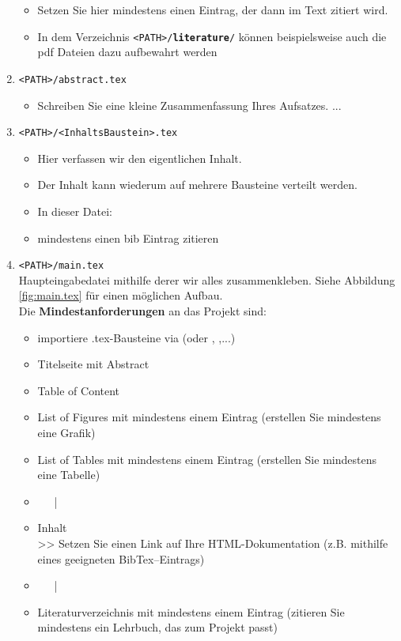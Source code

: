 \begin{enumerate}
\begin{itemize}
			\item Setzen Sie hier mindestens einen Eintrag, der dann im Text zitiert wird.
			\item In dem Verzeichnis \texttt{<PATH>/\textbf{literature}/} können beispielsweise auch die pdf Dateien dazu aufbewahrt werden
		\end{itemize}
		\item \texttt{<PATH>/abstract.tex}
		\begin{itemize}\small
			\item Schreiben Sie eine kleine Zusammenfassung Ihres Aufsatzes. ...
		\end{itemize}
		\item \texttt{<PATH>/<InhaltsBaustein>.tex}
		\begin{itemize}\small
			\item Hier verfassen wir den eigentlichen Inhalt.
			\item Der Inhalt kann wiederum auf mehrere Bausteine verteilt werden.
			\item In dieser Datei: \texttt{}
			\item mindestens einen bib Eintrag zitieren 
		\end{itemize}	
		\item \texttt{<PATH>/main.tex}\\\small
		Haupteingabedatei mithilfe derer wir alles zusammenkleben. Siehe Abbildung \ref{fig:main.tex} für einen möglichen Aufbau.\\
		Die \textbf{Mindestanforderungen} an das Projekt sind:\vspace{-0.1cm}
		\begin{itemize} 
			\item importiere .tex-Bausteine via  (oder , ,...)
			\item Titelseite mit Abstract
			\item Table of Content
			\item List of Figures mit mindestens einem Eintrag (erstellen Sie mindestens eine Grafik)
			\item List of Tables mit mindestens einem Eintrag (erstellen Sie mindestens eine Tabelle)
			\item[] ~~~|
			\item[] Inhalt\\
			\hspace*{0.5cm}>> Setzen Sie einen Link auf Ihre HTML-Dokumentation (z.B. mithilfe eines geeigneten BibTex--Eintrags)
			\item[] ~~~|
			\item Literaturverzeichnis mit mindestens einem Eintrag (zitieren Sie mindestens ein Lehrbuch, das zum Projekt passt)
		\end{itemize}
	\end{enumerate}
